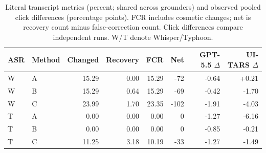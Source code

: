 \begin{table}[t]
\centering
\caption{Literal transcript metrics (percent; shared across grounders) and observed pooled click differences (percentage points). FCR includes cosmetic changes; net is recovery count minus false-correction count. Click differences compare independent runs. W/T denote Whisper/Typhoon.}
\label{tab:correction}
\small
\begin{tabular}{llrrrrrr}
\toprule
ASR & Method & Changed & Recovery & FCR & Net & GPT-5.5 $\Delta$ & UI-TARS $\Delta$ \\
\midrule
W & A & 15.29 & 0.00 & 15.29 & -72 & -0.64 & +0.21 \\
W & B & 15.29 & 0.64 & 15.29 & -69 & -0.42 & -1.70 \\
W & C & 23.99 & 1.70 & 23.35 & -102 & -1.91 & -4.03 \\
T & A & 0.00 & 0.00 & 0.00 & 0 & -1.27 & -6.16 \\
T & B & 0.00 & 0.00 & 0.00 & 0 & -0.85 & -0.21 \\
T & C & 11.25 & 3.18 & 10.19 & -33 & -1.27 & -1.49 \\
\bottomrule
\end{tabular}
\end{table}
